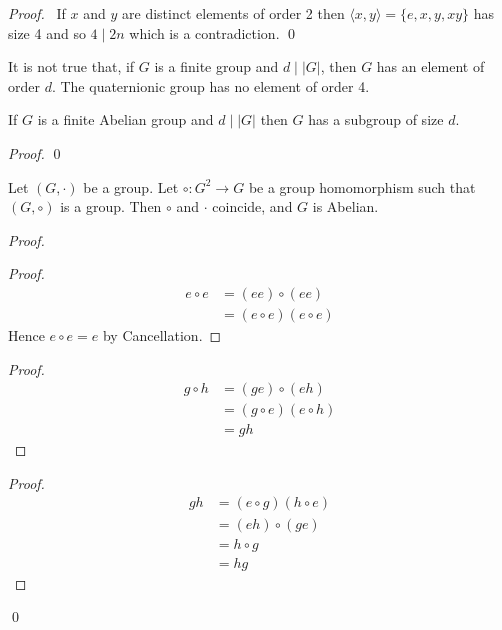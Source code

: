 \begin{proof}
\pf\ If $x$ and $y$ are distinct elements of order 2 then $\langle x,y \rangle = \{ e, x, y, xy \}$ has size 4 and so $4 \mid 2n$ which is a contradiction. \qed
\end{proof}

\begin{ex}
It is not true that, if $G$ is a finite group and $d \mid |G|$, then $G$ has an element of order $d$. The quaternionic group has no element of order 4.
\end{ex}

\begin{prop}
If $G$ is a finite Abelian group and $d \mid |G|$ then $G$ has a subgroup of size $d$.
\end{prop}

\begin{proof}
\pf
{}
\qed
\end{proof}

\begin{prop}
Let $(G,\cdot)$ be a group. Let $\circ : G^2 \rightarrow G$ be a group homomorphism such that $(G,\circ)$ is a group. Then $\circ$ and $\cdot$ coincide, and $G$ is Abelian.
\end{prop}

\begin{proof}
\pf
{}
\begin{proof}
\pf
\begin{align*}
e \circ e & = (ee) \circ (ee) \\
& = (e \circ e) (e \circ e)
\end{align*}
Hence $e \circ e = e$ by Cancellation.
\end{proof}
\begin{proof}
\pf
\begin{align*}
g \circ h & = (ge) \circ (eh) \\
& = (g \circ e)(e \circ h) \\
& = gh
\end{align*}
\end{proof}
\begin{proof}
\pf
\begin{align*}
gh & = (e \circ g)(h \circ e) \\
& = (eh) \circ (ge) \\
& = h \circ g \\
& = hg
\end{align*}
\end{proof}
\qed
\end{proof}

